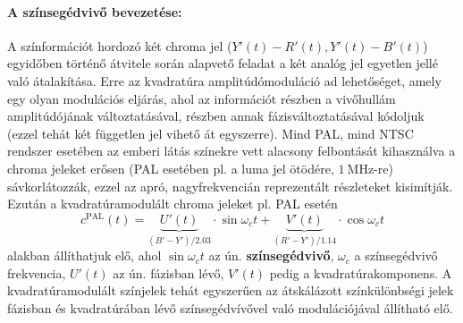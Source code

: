 \paragraph{A színsegédvivő bevezetése:}
A színformációt hordozó két chroma jel ($Y'(t)-R'(t), Y'(t)-B'(t)$) egyidőben történő átvitele során alapvető feladat a két analóg jel egyetlen jellé való átalakítása.
Erre az kvadratúra amplitúdómoduláció ad lehetőséget, amely egy olyan modulációs eljárás, ahol az információt részben a vivőhullám amplitúdójának változtatásával, részben annak fázisváltoztatásával kódoljuk (ezzel tehát két független jel vihető át egyszerre). 
Mind PAL, mind NTSC rendszer esetében az emberi látás színekre vett alacsony felbontását kihasználva a chroma jeleket erősen (PAL esetében pl. a luma jel ötödére, $1~\mathrm{MHz}$-re) sávkorlátozzák, ezzel az apró, nagyfrekvencián reprezentált részleteket kisimítják. 
Ezután a kvadratúramodulált chroma jeleket pl. PAL esetén
\begin{equation}
c^{\mathrm{PAL}}(t) = \underbrace{U'(t)}_{\left( B'- Y'\right) / 2.03} \cdot \sin \omega_c t + \underbrace{V'(t)}_{\left( R'- Y'\right) / 1.14}  \cdot \cos \omega_c t
\label{Eq:PAL_cr}
\end{equation}
alakban állíthatjuk elő, ahol $\sin \omega_c t$ az ún. \textbf{színsegédvivő}, $\omega_c$ a színsegédvivő frekvencia, $U'(t)$ az ún. fázisban lévő, $V'(t)$ pedig a kvadratúrakomponens.
A kvadratúramodulált színjelek tehát egyszerűen az átskálázott színkülönbségi jelek fázisban és kvadratúrában lévő színsegédvívővel való modulációjával állítható elő.

